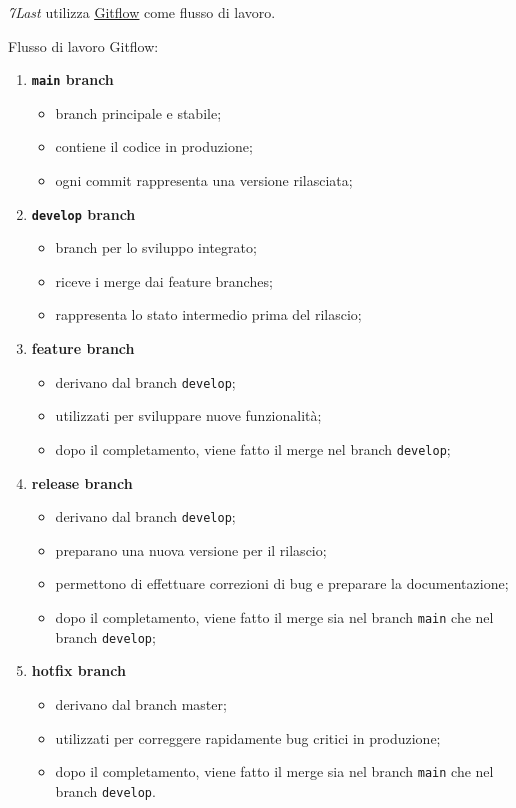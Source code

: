 \textit{7Last} utilizza \href{https://www.atlassian.com/it/git/tutorials/comparing-workflows/gitflow-workflow}{\underline{{Gitflow}}} come flusso di lavoro.
\begin{flushleft}
	Flusso di lavoro Gitflow:
\end{flushleft}
\begin{enumerate}
    \item \textbf{\texttt{main} branch}
    \begin{itemize}
        \item branch principale e stabile;
        \item contiene il codice in produzione;
        \item ogni commit rappresenta una versione rilasciata;
    \end{itemize}

    \item \textbf{\texttt{develop} branch}
    \begin{itemize}
        \item branch per lo sviluppo integrato;
        \item riceve i merge dai feature branches;
        \item rappresenta lo stato intermedio prima del rilascio;
    \end{itemize}

    \item \textbf{feature branch}
    \begin{itemize}
        \item derivano dal branch \texttt{develop};
        \item utilizzati per sviluppare nuove funzionalità;
        \item dopo il completamento, viene fatto il merge nel branch \texttt{develop};
    \end{itemize}

    \item \textbf{release branch}
    \begin{itemize}
        \item derivano dal branch \texttt{develop};
        \item preparano una nuova versione per il rilascio;
        \item permettono di effettuare correzioni di bug e preparare la documentazione;
        \item dopo il completamento, viene fatto il merge sia nel branch \texttt{main} che nel branch \texttt{develop};
    \end{itemize}

    \item \textbf{hotfix branch}
    \begin{itemize}
        \item derivano dal branch master;
        \item utilizzati per correggere rapidamente bug critici in produzione;
        \item dopo il completamento, viene fatto il merge sia nel branch \texttt{main} che nel branch \texttt{develop}.
    \end{itemize}
\end{enumerate}

